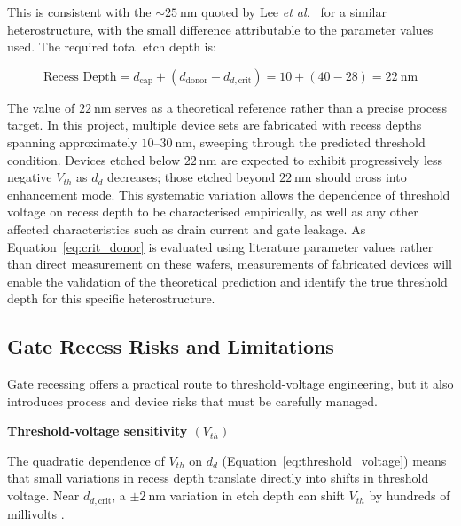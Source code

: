 This is consistent with the $\sim\!25~\text{nm}$ quoted by Lee
\textit{et al.}~\cite{ivcv-hemt} for a similar heterostructure, with
the small difference attributable to the parameter values used.
The required total etch depth is:

\begin{equation}
    \text{Recess Depth} = d_{\text{cap}} +
    \left(d_{\text{donor}} - d_{d,\text{crit}}\right)
    = 10 + (40 - 28) = 22~\text{nm}
    \label{eq:recess_depth}
\end{equation}

The value of $22~\text{nm}$ serves as a theoretical reference rather
than a precise process target. In this project, multiple device sets are
fabricated with recess depths spanning approximately $10\text{--}30~\text{nm}$,
sweeping through the predicted threshold condition. Devices etched below
$22~\text{nm}$ are expected to exhibit progressively less negative $V_{th}$
as $d_d$ decreases; those etched beyond $22~\text{nm}$ should cross into
enhancement mode. This systematic variation allows the dependence of
threshold voltage on recess depth to be characterised
empirically, as well as any other affected characteristics such as
drain current and gate leakage. As Equation~\ref{eq:crit_donor} is evaluated using literature
parameter values rather than direct measurement on these wafers, measurements of fabricated devices
will enable the validation of the theoretical prediction and
identify the true threshold depth for this specific heterostructure.

\subsection{Gate Recess Risks and Limitations}

Gate recessing offers a practical route to threshold-voltage engineering, but it
also introduces process and device risks that must be carefully managed.

\vspace{2mm}

\noindent\textbf{Threshold-voltage sensitivity $(V_{th})$}

\vspace{2mm}

\noindent The quadratic dependence of $V_{th}$ on $d_d$
(Equation~\ref{eq:threshold_voltage}) means that small variations in recess
depth translate directly into shifts in threshold voltage. Near
$d_{d,\text{crit}}$, a $\pm 2~\text{nm}$ variation in etch depth can shift
$V_{th}$ by hundreds of millivolts \cite{ivcv-hemt}.

